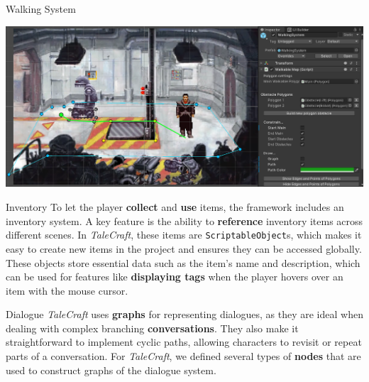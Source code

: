 \documentclass[portrait,a0paper,fontscale=0.35]{baposter}
\begin{document}
\begin{poster}
\begin{posterbox}[column=0, span=1, name=ws, below=cs]{Walking System}
\begin{center}
\includegraphics[width=1\linewidth]{img/walkable_map5.png}
\end{center}
\end{posterbox}

%
%
%

\begin{posterbox}[column=1, span=1, name=is]{Inventory}
To let the player \textbf{collect} and \textbf{use} items, the framework includes an inventory system. A key feature is the ability to \textbf{reference} inventory items across different scenes. In \textit{TaleCraft}, these items are \verb|ScriptableObject|s, which makes it easy to create new items in the project and ensures they can be accessed globally. These objects store essential data such as the item's name and description, which can be used for features like \textbf{displaying tags }when the player hovers over an item with the mouse cursor.
\end{posterbox}

\begin{posterbox}[column=1, span=1, name=ds, below=is, %
]{Dialogue}
\textit{TaleCraft} uses \textbf{graphs} for representing dialogues, as they are ideal when dealing with complex branching \textbf{conversations}. They also make it straightforward to implement cyclic paths, allowing characters to revisit or repeat parts of a conversation. For \textit{TaleCraft}, we defined several types of \textbf{nodes} that are used to construct graphs of the dialogue system.


\end{posterbox}
\end{poster}
\end{document}
